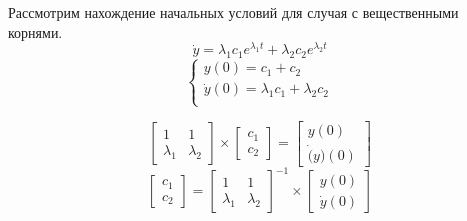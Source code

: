 Рассмотрим нахождение начальных условий для случая с вещественными корнями. 
\begin{equation}
    \dot{y} = \lambda_1 c_1 e^{\lambda_1 t} + \lambda_2 c_2 e^{\lambda_2 t}
\end{equation}
\begin{equation}
    \begin{cases}
        y(0) = c_1 + c_2  \\
        \dot{y}(0) = \lambda_1 c_1 + \lambda_2 c_2  \\
    \end{cases}
\end{equation}

\begin{equation}
    \begin{bmatrix}
        1 & 1 \\
        \lambda_1 & \lambda_2
    \end{bmatrix} \times
    \begin{bmatrix}
        c_1 \\
        c_2
    \end{bmatrix} =
    \begin{bmatrix}
        y(0) \\
        \dot(y)(0)
    \end{bmatrix} 
\end{equation}
\begin{equation}
    \begin{bmatrix}
        c_1 \\
        c_2
    \end{bmatrix} = 
    \begin{bmatrix}
        1 & 1 \\
        \lambda_1 & \lambda_2
    \end{bmatrix}^{-1} \times
    \begin{bmatrix}
        y(0) \\
        \dot{y}(0)
    \end{bmatrix}
\end{equation}

